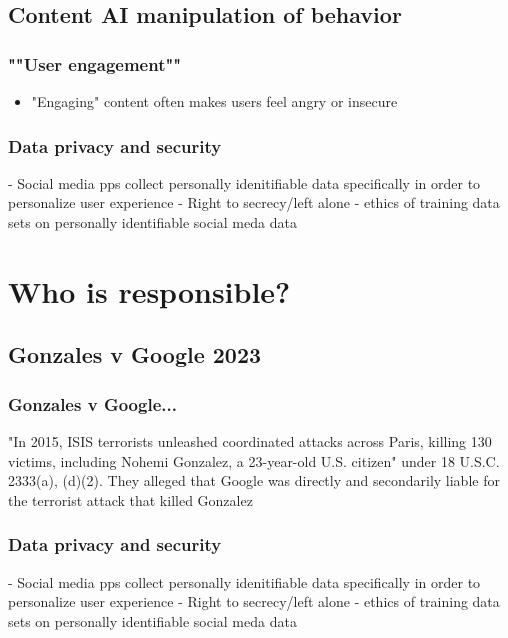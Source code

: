 \documentclass{beamer}
\begin{document}
\subsection{Content AI manipulation of behavior}

\begin{frame}
\frametitle{""User engagement""}
	\begin{itemize}
		\item "Engaging" content often makes users feel angry or insecure
	\end{itemize}
\end{frame}


\begin{frame}
  \frametitle{Data privacy and security}
	- Social media pps collect personally idenitifiable data specifically in order to personalize user experience
	- Right to secrecy/left alone
	- ethics of training data sets on personally identifiable social meda data
\end{frame}

\section{Who is responsible?}

\subsection{Gonzales v Google 2023}
\begin{frame}
\frametitle{Gonzales v Google...}
	"In 2015, ISIS terrorists unleashed coordinated attacks across Paris, killing 130 victims, including Nohemi Gonzalez, a 23-year-old U.S. citizen"
	under 18 U.S.C. 2333(a), (d)(2). They alleged that Google was directly and secondarily liable for the terrorist attack that killed Gonzalez
\end{frame}

\begin{frame}
  \frametitle{Data privacy and security}
	- Social media pps collect personally idenitifiable data specifically in order to personalize user experience
	- Right to secrecy/left alone
	- ethics of training data sets on personally identifiable social meda data
\end{frame}
\end{document}
